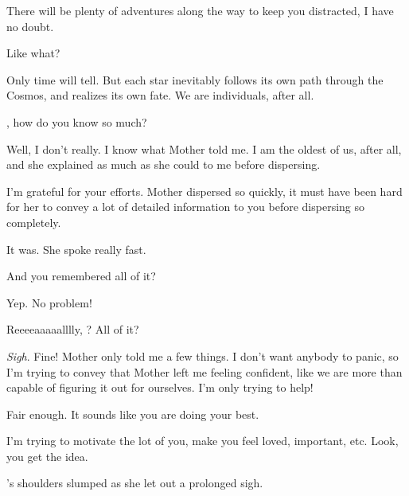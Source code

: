 \documentclass[main.tex]{subfiles}
\begin{document}
\par \Maia There will be plenty of adventures along the way to keep you distracted, I have no doubt.

\par \Sterope  Like what?  

\par \Maia Only time will tell.  But each star inevitably follows its own path through the Cosmos, and realizes its own fate.  We are individuals, after all.

\par \Sterope \rmmaia, how do you know so much?

\par \Maia Well, I don't really. I know what Mother told me.  I am the oldest of us, after all, and she explained as much as she could to me before dispersing.  

\par \Sterope I'm grateful for your efforts.  Mother dispersed so quickly, it must have been hard for her to convey a lot of detailed information to you before dispersing so completely.

\par \Maia It was.  She spoke really fast.

\par \Sterope And you remembered all of it?

\par \Maia Yep.  No problem!  

\par \Sterope Reeeeaaaaalllly, \rmmaia?  All of it?

\par \Maia \textit{Sigh}.  Fine!  Mother only told me a few things.  I don't want anybody to panic, so I'm trying to convey that Mother left me feeling confident, like we are more than capable of figuring it out for ourselves.  I'm only trying to help!  

\par \Sterope Fair enough.  It sounds like you are doing your best.

\par \Maia I'm trying to motivate the lot of you, make you feel loved, important, etc.  Look, you get the idea. 

\par \nar \rmmaia's shoulders slumped as she let out a prolonged sigh.
\end{document}
